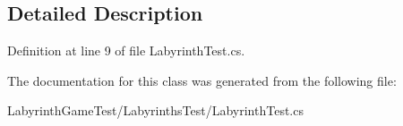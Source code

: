 \subsection{Detailed Description}


Definition at line 9 of file Labyrinth\+Test.\+cs.



The documentation for this class was generated from the following file\+:\begin{DoxyCompactItemize}
\item 
Labyrinth\+Game\+Test/\+Labyrinths\+Test/Labyrinth\+Test.\+cs\end{DoxyCompactItemize}
